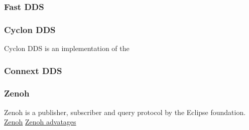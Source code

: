 \subsubsection*{Fast DDS}

\subsubsection*{Cyclon DDS}
Cyclon DDS is an implementation of the 
\subsubsection*{Connext DDS}
\subsubsection*{Zenoh}
Zenoh is a publisher, subscriber and query protocol by the Eclipse foundation.
\href{https://www.adlinktech.com/en/Zenoh}{Zenoh} 
\href{https://zenoh.io/blog/2021-03-23-discovery/}{Zenoh advatages} 

